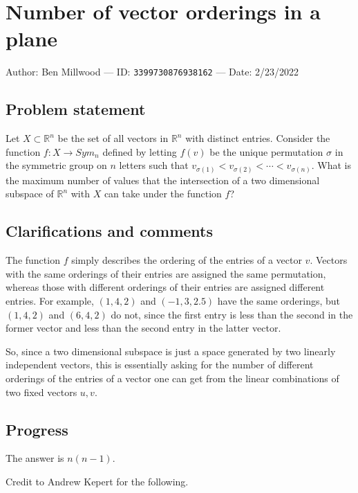 
\section{Number of vector orderings in a plane}

Author: Ben Millwood --- ID: \verb`3399730876938162` --- Date: 2/23/2022

\subsection{Problem statement}

Let $X\subset\mathbb{R}^n$ be the set of all vectors in $\mathbb{R}^n$ with distinct entries. Consider the function $f:X\to Sym_n$ defined by letting $f(v)$ be the unique permutation $\sigma$ in the symmetric group on $n$ letters such that $v_{\sigma(1)}<v_{\sigma(2)}<\cdots< v_{\sigma(n)}$. What is the maximum number of values that the intersection of a two dimensional subspace of $\mathbb{R}^n$ with $X$ can take under the function $f$?

\subsection{Clarifications and comments}

The function $f$ simply describes the ordering of the entries of a vector $v$. Vectors with the same orderings of their entries are assigned the same permutation, whereas those with different orderings of their entries are assigned different entries. For example, $(1,4,2)$ and $(-1,3,2.5)$ have the same orderings, but $(1,4,2)$ and $(6,4,2)$ do not, since the first entry is less than the second in the former vector and less than the second entry in the latter vector.

So, since a two dimensional subspace is just a space generated by two linearly independent vectors, this is essentially asking for the number of different orderings of the entries of a vector one can get from the linear combinations of two fixed vectors $u,v$.

\subsection{Progress}

The answer is $n(n-1)$.

Credit to Andrew Kepert for the following.

